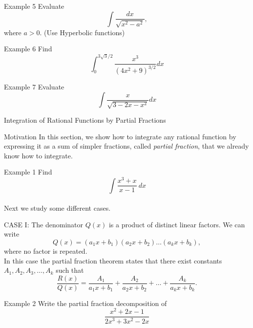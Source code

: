 \documentclass{beamer}
\begin{document}
\begin{frame}{Example 5}
    Evaluate \[\int \dfrac{dx}{\sqrt{x^2-a^2}},\] where \(a>0\). (Use Hyperbolic functions)
    
\end{frame}

\begin{frame}{Example 6}
    Find \[\int_{0}^{3\sqrt{3}/2}\dfrac{x^3}{(4x^2+9)^{3/2}}dx\]
\end{frame}

\begin{frame}{Example 7}
    Evaluate \[\int \dfrac{x}{\sqrt{3-2x-x^2}}dx\]
\end{frame}

\begin{frame}{}
\begin{center}
    \Huge{Integration of Rational Functions by Partial Fractions}
\end{center}
\end{frame}

\begin{frame}{Motivation}
In this section, we show how to integrate any rational function by expressing it as a sum of simpler fractions, called \textit{partial fraction}, that we already know how to integrate. 
\end{frame}

    \begin{frame}{Example 1}
    Find \[\int \dfrac{x^3+x}{x-1}~dx\]\\ \pause
    \vspace{0.5in}
    Next we study some different cases. 
    \end{frame}

\begin{frame}{CASE I: The denominator \(Q(x)\) is a product of distinct linear factors.}    
We can write \[Q(x)=(a_1 x+b_1)(a_2x+b_2)\dots (a_k x +b_k),\] where no factor is repeated. \\ \pause
\vspace{0.2in}
In this case the partial fraction theorem states that there exist constants \(A_1,A_2,A_3, \dots , A_k\) such that \[\dfrac{R(x)}{Q(x)}= \dfrac{A_1}{a_1x+b_1}+ \dfrac{A_2}{a_2x+b_2}+ \dots + \dfrac{A_k}{a_k x +b_k}.\]
\end{frame}

\begin{frame}{Example 2}
Write the partial fraction decomposition of \[\dfrac{x^2 +2x -1}{2x^3+3x^2-2x}\]
\end{frame}
\end{document}
